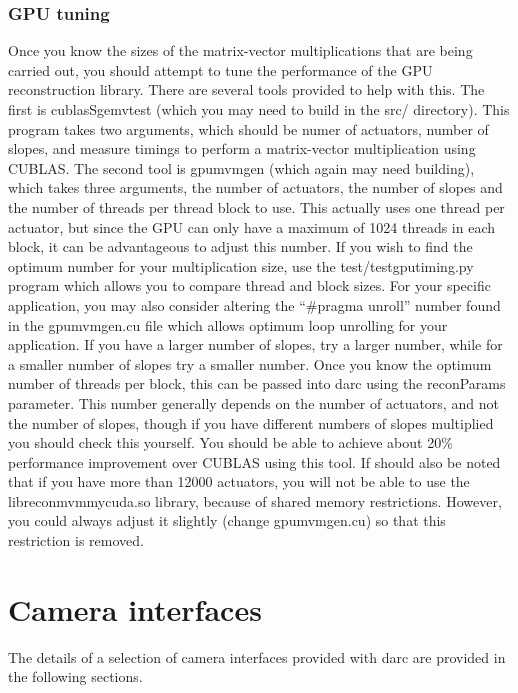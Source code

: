 \documentclass[a4,10pt]{article}
\begin{document}
\subsubsection{GPU tuning}
Once you know the sizes of the matrix-vector multiplications that are
being carried out, you should attempt to tune the performance of the
GPU reconstruction library.  There are several tools provided to help
with this.  The first is cublasSgemvtest (which you may need to build
in the src/ directory).  This program takes two arguments, which
should be numer of actuators, number of slopes, and measure timings to
perform a matrix-vector multiplication using CUBLAS.  The second tool
is gpumvmgen (which again may need building), which takes three
arguments, the number of actuators, the number of slopes and the
number of threads per thread block to use.  This actually uses one
thread per actuator, but since the GPU can only have a maximum of 1024
threads in each block, it can be advantageous to adjust this number.
If you wish to find the optimum number for your multiplication size,
use the test/testgputiming.py program which allows you to compare
thread and block sizes.  For your specific application, you may also
consider altering the ``\#pragma unroll'' number found in the
gpumvmgen.cu file which allows optimum loop unrolling for your
application.  If you have a larger number of slopes, try a larger
number, while for a smaller number of slopes try a smaller number.
Once you know the optimum number of threads per block, this can be
passed into darc using the reconParams parameter.  This number
generally depends on the number of actuators, and not the number of
slopes, though if you have different numbers of slopes multiplied you
should check this yourself.  You should be able to achieve about 20\%
performance improvement over CUBLAS using this tool.  If should also
be noted that if you have more than 12000 actuators, you will not be
able to use the libreconmvmmycuda.so library, because of shared memory
restrictions.  However, you could always adjust it slightly (change
gpumvmgen.cu) so that this restriction is removed.



\section{Camera interfaces}
The details of a selection of camera interfaces provided with darc are
provided in the following sections.
\end{document}
